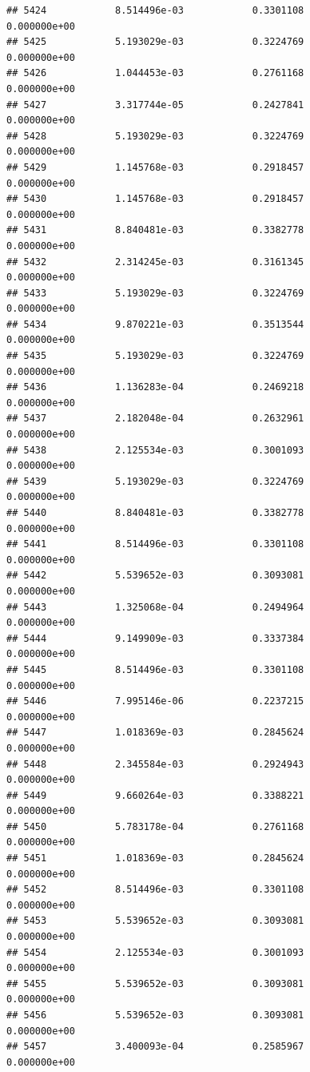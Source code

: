 \documentclass[
]{article}
\begin{document}
\begin{verbatim}
## 5424            8.514496e-03            0.3301108            0.000000e+00
## 5425            5.193029e-03            0.3224769            0.000000e+00
## 5426            1.044453e-03            0.2761168            0.000000e+00
## 5427            3.317744e-05            0.2427841            0.000000e+00
## 5428            5.193029e-03            0.3224769            0.000000e+00
## 5429            1.145768e-03            0.2918457            0.000000e+00
## 5430            1.145768e-03            0.2918457            0.000000e+00
## 5431            8.840481e-03            0.3382778            0.000000e+00
## 5432            2.314245e-03            0.3161345            0.000000e+00
## 5433            5.193029e-03            0.3224769            0.000000e+00
## 5434            9.870221e-03            0.3513544            0.000000e+00
## 5435            5.193029e-03            0.3224769            0.000000e+00
## 5436            1.136283e-04            0.2469218            0.000000e+00
## 5437            2.182048e-04            0.2632961            0.000000e+00
## 5438            2.125534e-03            0.3001093            0.000000e+00
## 5439            5.193029e-03            0.3224769            0.000000e+00
## 5440            8.840481e-03            0.3382778            0.000000e+00
## 5441            8.514496e-03            0.3301108            0.000000e+00
## 5442            5.539652e-03            0.3093081            0.000000e+00
## 5443            1.325068e-04            0.2494964            0.000000e+00
## 5444            9.149909e-03            0.3337384            0.000000e+00
## 5445            8.514496e-03            0.3301108            0.000000e+00
## 5446            7.995146e-06            0.2237215            0.000000e+00
## 5447            1.018369e-03            0.2845624            0.000000e+00
## 5448            2.345584e-03            0.2924943            0.000000e+00
## 5449            9.660264e-03            0.3388221            0.000000e+00
## 5450            5.783178e-04            0.2761168            0.000000e+00
## 5451            1.018369e-03            0.2845624            0.000000e+00
## 5452            8.514496e-03            0.3301108            0.000000e+00
## 5453            5.539652e-03            0.3093081            0.000000e+00
## 5454            2.125534e-03            0.3001093            0.000000e+00
## 5455            5.539652e-03            0.3093081            0.000000e+00
## 5456            5.539652e-03            0.3093081            0.000000e+00
## 5457            3.400093e-04            0.2585967            0.000000e+00

\end{verbatim}
\end{document}
